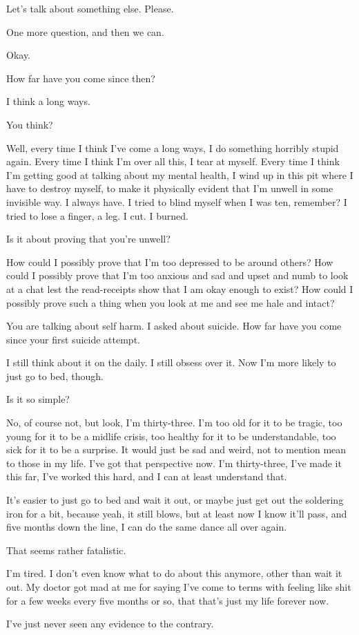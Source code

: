 \noindent Let's talk about something else. Please.

\begin{ally}
One more question, and then we can.
\end{ally}
Okay.

\begin{ally}
How far have you come since then?
\end{ally}
I think a long ways.

\begin{ally}
You think?
\end{ally}
Well, every time I think I've come a long ways, I do something horribly stupid again. Every time I think I'm over all this, I tear at myself. Every time I think I'm getting good at talking about my mental health, I wind up in this pit where I have to destroy myself, to make it physically evident that I'm unwell in some invisible way. I always have. I tried to blind myself when I was ten, remember? I tried to lose a finger, a leg. I cut. I burned.

\begin{ally}
Is it about proving that you're unwell?
\end{ally}
How could I possibly prove that I'm too depressed to be around others? How could I possibly prove that I'm too anxious and sad and upset and numb to look at a chat lest the read-receipts show that I am okay enough to exist? How could I possibly prove such a thing when you look at me and see me hale and intact?

\begin{ally}
You are talking about self harm. I asked about suicide. How far have you come since your first suicide attempt.
\end{ally}
I still think about it on the daily. I still obsess over it. Now I'm more likely to just go to bed, though.

\begin{ally}
Is it so simple?
\end{ally}
No, of course not, but look, I'm thirty-three. I'm too old for it to be tragic, too young for it to be a midlife crisis, too healthy for it to be understandable, too sick for it to be a surprise. It would just be sad and weird, not to mention mean to those in my life. I've got that perspective now. I'm thirty-three, I've made it this far, I've worked this hard, and I can at least understand that.

It's easier to just go to bed and wait it out, or maybe just get out the soldering iron for a bit, because yeah, it still blows, but at least now I know it'll pass, and five months down the line, I can do the same dance all over again.

\begin{ally}
That seems rather fatalistic.
\end{ally}
I'm tired. I don't even know what to do about this anymore, other than wait it out. My doctor got mad at me for saying I've come to terms with feeling like shit for a few weeks every five months or so, that that's just my life forever now.

I've just never seen any evidence to the contrary.
\newpage

